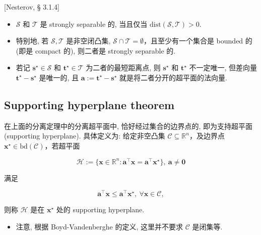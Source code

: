 \begin{colblock}{}
[Nesterov, § 3.1.4]

\begin{itemize}
\item {}$\mathcal{S}$ 和 $\mathcal{T}$ 是 strongly separable 的, 当且仅当 $\text{dist}(\mathcal{S}, \mathcal{T}) > 0$.


\item {}特别地, 若 $\mathcal{S}, \mathcal{T}$ 是非空闭凸集, $\mathcal{S} \cap \mathcal{T} = \emptyset$，且至少有一个集合是 bounded 的 (即是 compact 的), 则二者是 strongly separable 的.


\item {}若记 $\bm{s}^\star \in \mathcal{S}$ 和 $\bm{t}^\star \in \mathcal{T}$ 为二者的最短距离点, 则 $\bm{s}^\star$ 和 $\bm{t}^\star$ 不一定唯一, 但差向量 $\bm{t}^\star-\bm{s}^\star$ 是唯一的, 且 $\bm{a} := \bm{t}^\star - \bm{s}^\star$ 就是将二者分开的超平面的法向量.


\end{itemize}

\end{colblock}

\subsection{Supporting hyperplane theorem}


\begin{defblock}
在上面的分离定理中的分离超平面中, 恰好经过集合的边界点的, 即为支持超平面 (supporting hyperplane). 具体定义为: 给定非空凸集 $\mathcal{C} \subseteq \mathbb{R}^n$，及边界点 $\bm{x}^\star \in \text{bd}(\mathcal{C})$，若超平面

\[
\mathcal{H} := \{\bm{x} \in \mathbb{R}^n: \bm{a}^\top \bm{x} =  \bm{a}^\top \bm{x}^\star\},~ \bm{a} \neq \bm{0}
\]

满足

\[
\bm{a}^\top \bm{x} \leq \bm{a}^\top \bm{x}^\star,~ \forall \bm{x} \in \mathcal{C},
\]

则称 $\mathcal{H}$ 是在 $\bm{x}^\star$ 处的 supporting hyperplane.

\end{defblock}

\begin{itemize}
\item {}注意, 根据 Boyd-Vandenberghe 的定义, 这里并不要求 $\mathcal{C}$ 是闭集等.


\end{itemize}


